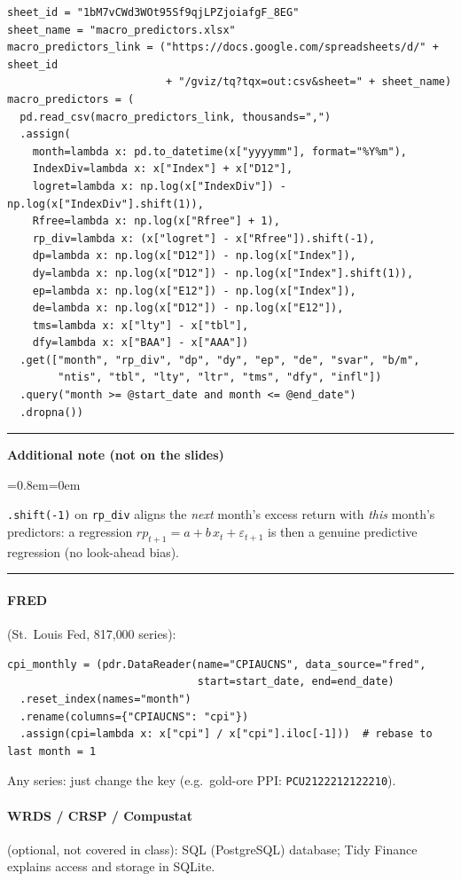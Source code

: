 \documentclass[11pt,a4paper]{report}
\newenvironment{notebox}[1]
  {\par\medskip\Needspace{6\baselineskip}\noindent\rule{\linewidth}{0.4pt}\par\nopagebreak
   \noindent\textbf{#1}\par\nopagebreak
   \begin{list}{}{\leftmargin=0.8em\rightmargin=0em\topsep=2pt}\item[]}
  {\end{list}\nopagebreak\noindent\rule{\linewidth}{0.4pt}\par\medskip}
\newenvironment{addnote}{\begin{notebox}{Additional note (not on the slides)}}{\end{notebox}}
\begin{document}
\begin{lstlisting}
sheet_id = "1bM7vCWd3WOt95Sf9qjLPZjoiafgF_8EG"
sheet_name = "macro_predictors.xlsx"
macro_predictors_link = ("https://docs.google.com/spreadsheets/d/" + sheet_id
                         + "/gviz/tq?tqx=out:csv&sheet=" + sheet_name)
macro_predictors = (
  pd.read_csv(macro_predictors_link, thousands=",")
  .assign(
    month=lambda x: pd.to_datetime(x["yyyymm"], format="%Y%m"),
    IndexDiv=lambda x: x["Index"] + x["D12"],
    logret=lambda x: np.log(x["IndexDiv"]) - np.log(x["IndexDiv"].shift(1)),
    Rfree=lambda x: np.log(x["Rfree"] + 1),
    rp_div=lambda x: (x["logret"] - x["Rfree"]).shift(-1),
    dp=lambda x: np.log(x["D12"]) - np.log(x["Index"]),
    dy=lambda x: np.log(x["D12"]) - np.log(x["Index"].shift(1)),
    ep=lambda x: np.log(x["E12"]) - np.log(x["Index"]),
    de=lambda x: np.log(x["D12"]) - np.log(x["E12"]),
    tms=lambda x: x["lty"] - x["tbl"],
    dfy=lambda x: x["BAA"] - x["AAA"])
  .get(["month", "rp_div", "dp", "dy", "ep", "de", "svar", "b/m",
        "ntis", "tbl", "lty", "ltr", "tms", "dfy", "infl"])
  .query("month >= @start_date and month <= @end_date")
  .dropna())
\end{lstlisting}
\begin{addnote}
\texttt{.shift(-1)} on \texttt{rp\_div} aligns the \emph{next} month's excess
return with \emph{this} month's predictors: a regression
$rp_{t+1}=a+b\,x_t+\varepsilon_{t+1}$ is then a genuine predictive regression
(no look-ahead bias).
\end{addnote}

\paragraph{FRED} (St.\ Louis Fed, 817{,}000 series):
\begin{lstlisting}
cpi_monthly = (pdr.DataReader(name="CPIAUCNS", data_source="fred",
                              start=start_date, end=end_date)
  .reset_index(names="month")
  .rename(columns={"CPIAUCNS": "cpi"})
  .assign(cpi=lambda x: x["cpi"] / x["cpi"].iloc[-1]))  # rebase to last month = 1
\end{lstlisting}
Any series: just change the key (e.g.\ gold-ore PPI: \texttt{PCU2122212122210}).

\paragraph{WRDS / CRSP / Compustat} (optional, not covered in class): SQL
(PostgreSQL) database; Tidy Finance explains access and storage in SQLite.
\end{document}
